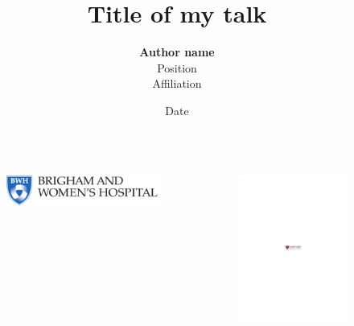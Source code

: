 \documentclass[pdf, usepdftitle=false]{beamer}
\title{Title of my talk}
\author{\textbf{Author name} \\ [\baselineskip]
    Position\\
    Affiliation
    }
\date{Date}
\begin{document}
\begin{frame}[plain]
\titlepage
\begin{columns}
\begin{column}{0.33\textwidth}
\begin{figure}[b]
\includegraphics[width=\textwidth]{BWHlogo}
\end{figure}
\end{column}
\begin{column}{0.33\textwidth}
\begin{figure}[b]
\includegraphics[width=\textwidth]{HMS}

\end{figure}
\end{column}
\end{columns}
\end{frame}
\end{document}
